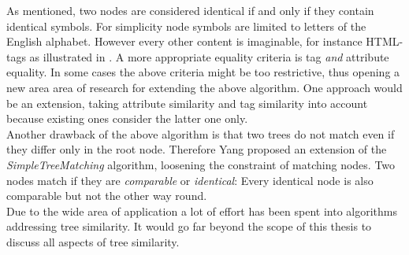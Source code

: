 \documentclass[12pt, notitlepage]{article}
\begin{document}
\vspace{\baselineskip}
As \cite{yang} mentioned, two nodes are considered identical if and only if they contain identical symbols. For simplicity
node symbols are limited to letters of the English alphabet. However every other content is imaginable, for instance HTML-tags
as illustrated in \cite{simple-tree-matching}. A more appropriate equality criteria is tag \textit{and} attribute equality. 
In some cases the above criteria might be too restrictive, thus opening a new area area of research for extending the above algorithm.
One approach would be an extension, taking attribute similarity and tag similarity into account because existing
ones\cite{simple-tree-matching} consider the latter one only.\\
Another drawback of the above algorithm is that two trees do not match even if they differ only in the root node. 
Therefore Yang\cite{yang} proposed an extension of the \textit{SimpleTreeMatching} algorithm, loosening the constraint of matching
nodes. Two nodes match if they are \textit{comparable} or \textit{identical}: Every identical node is also comparable but not the other way round. \\
Due to the wide area of application a lot of effort has been spent into algorithms addressing tree similarity.
It would go far beyond the scope of this thesis to discuss all aspects of tree similarity. 
\end{document}
